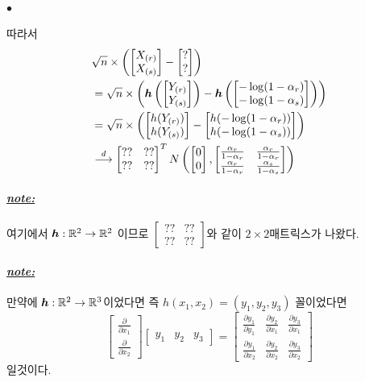 \documentclass[12pt,oneside,english]{book}
\def\ck{\paragraph{\Large$\bullet$}\Large}
\def\note{\paragraph{\Large\textit{\underline{note:}}}\Large}
\newcommand{\bsh}{\mbox{\boldmath $h$}}
\begin{document}
\ck 따라서 
\begin{align*}
& \sqrt{n}\times\left(\begin{bmatrix}X_{(r)} \\ X_{(s)}\end{bmatrix}-\begin{bmatrix}? \\ ? \end{bmatrix}\right) \\ 
& =\sqrt{n}\times\left(\bsh\left(\begin{bmatrix}Y_{(r)} \\ Y_{(s)}\end{bmatrix}\right)-\bsh\left(\begin{bmatrix} -\log(1-\alpha_r) \\ -\log(1-\alpha_s) \end{bmatrix}\right)\right) \\
& =\sqrt{n}\times\left(\begin{bmatrix}h(Y_{(r)}) \\ h(Y_{(s)})\end{bmatrix}-\begin{bmatrix} h(-\log(1-\alpha_r)) \\ h(-\log(1-\alpha_s)) \end{bmatrix}\right)\\ 
& \overset{d}{\longrightarrow} 
\begin{bmatrix}
?? & ?? \\
?? & ??
\end{bmatrix}^T N\left(\begin{bmatrix}0\\0\end{bmatrix},\begin{bmatrix} \frac{\alpha_r}{1-\alpha_r} & \frac{\alpha_r}{1-\alpha_r} \\ \frac{\alpha_r}{1-\alpha_r} & \frac{\alpha_s}{1-\alpha_s} \end{bmatrix}\right)
\end{align*}

\note 여기에서 $\bsh: \mathbb{R}^2 \to \mathbb{R}^2$ 이므로 $\begin{bmatrix}?? & ?? \\?? & ??\end{bmatrix}$와 같이 $2\times 2$매트릭스가 나왔다. 
\note 만약에 $\bsh: \mathbb{R}^2 \to \mathbb{R}^3$이었다면 즉 $h(x_1,x_2)=(y_1,y_2,y_3)$ 꼴이었다면 
\[
\begin{bmatrix}
\frac{\partial }{\partial x_1} \\ \frac{\partial }{\partial x_2}\end{bmatrix} \begin{bmatrix} y_1 & y_2 & y_3\end{bmatrix}=
\begin{bmatrix}
\frac{\partial y_1 }{\partial y_1} & \frac{\partial y_2}{\partial x_1} & \frac{\partial y_3}{\partial x_1} \\ 
\frac{\partial y_1}{\partial x_2} & \frac{\partial y_2}{\partial x_2} & \frac{\partial y_3}{\partial x_2} 
\end{bmatrix}
\]
일것이다. 
\end{document}
